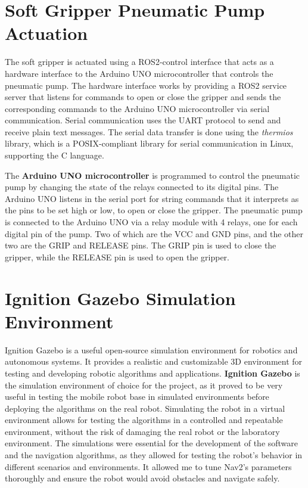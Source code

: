 \section{Soft Gripper Pneumatic Pump Actuation}

The soft gripper is actuated using a ROS2-control interface that acts as a hardware interface to the Arduino UNO
microcontroller that controls the pneumatic pump. The hardware interface works by providing a ROS2 service server that 
listens for commands to open or close the gripper and sends the corresponding commands to the Arduino UNO microcontroller
via serial communication. 
Serial communication uses the UART protocol to send and receive plain text messages.
The serial data transfer is done using the \textit{thermios} library, which is a POSIX-compliant library for serial
communication in Linux, supporting the C language.

The \textbf{Arduino UNO microcontroller} is programmed to control the pneumatic pump by changing
the state of the relays connected to its digital pins. The Arduino UNO listens in the serial port for string commands
that it interprets as the pins to be set high or low, to open or close the gripper. The pneumatic pump is connected
to the Arduino UNO via a relay module with 4 relays, one for each digital pin of the pump. Two of which
are the VCC and GND pins, and the other two are the GRIP and RELEASE pins. The GRIP pin is used to close the gripper,
while the RELEASE pin is used to open the gripper.


\section{Ignition Gazebo Simulation Environment}

Ignition Gazebo is a useful open-source simulation environment for robotics and autonomous systems.
It provides a realistic and customizable 3D environment for testing and developing robotic algorithms and applications.
\textbf{Ignition Gazebo} is the simulation environment of choice for the project,
as it proved to be very useful in testing the mobile robot base in simulated environments before deploying the algorithms
on the real robot. Simulating the robot in a virtual environment allows for testing the algorithms in 
a controlled and repeatable environment, without the risk of damaging the real robot or the laboratory environment.
The simulations were essential for the development of the software and the navigation algorithms, 
as they allowed for testing
the robot's behavior in different scenarios and environments. It allowed me to tune Nav2's parameters
thoroughly and ensure the robot would avoid obstacles and navigate safely.


